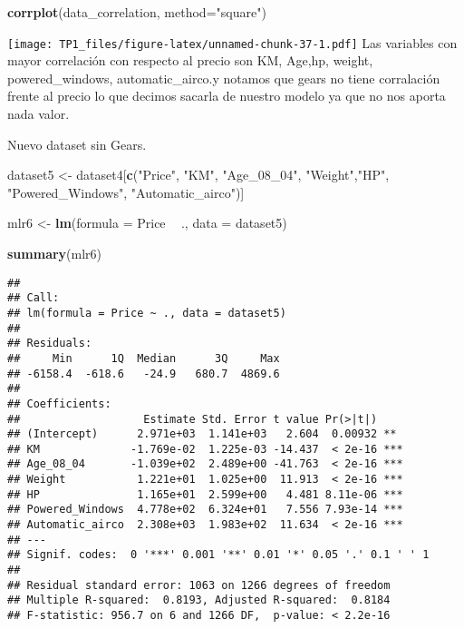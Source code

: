 \documentclass[
]{article}
\newenvironment{Shaded}{\begin{snugshade}}{\end{snugshade}}
\newcommand{\DataTypeTok}[1]{\textcolor[rgb]{0.13,0.29,0.53}{#1}}
\newcommand{\KeywordTok}[1]{\textcolor[rgb]{0.13,0.29,0.53}{\textbf{#1}}}
\newcommand{\NormalTok}[1]{#1}
\newcommand{\OperatorTok}[1]{\textcolor[rgb]{0.81,0.36,0.00}{\textbf{#1}}}
\newcommand{\StringTok}[1]{\textcolor[rgb]{0.31,0.60,0.02}{#1}}
\begin{document}
\begin{Shaded}
\begin{Highlighting}[]
\KeywordTok{corrplot}\NormalTok{(data_correlation, }\DataTypeTok{method=}\StringTok{"square"}\NormalTok{)}
\end{Highlighting}
\end{Shaded}

\texttt{[image: TP1\_files/figure-latex/unnamed-chunk-37-1.pdf]} Las
variables con mayor correlación con respecto al precio son KM, Age,hp,
weight, powered\_windows, automatic\_airco.y notamos que gears no tiene
corralación frente al precio lo que decimos sacarla de nuestro modelo ya
que no nos aporta nada valor.

Nuevo dataset sin Gears.

\begin{Shaded}
\begin{Highlighting}[]
\NormalTok{dataset5 <-}\StringTok{ }\NormalTok{dataset4[}\KeywordTok{c}\NormalTok{(}\StringTok{"Price"}\NormalTok{, }\StringTok{"KM"}\NormalTok{, }\StringTok{"Age_08_04"}\NormalTok{, }\StringTok{"Weight"}\NormalTok{,}\StringTok{"HP"}\NormalTok{, }
                       \StringTok{"Powered_Windows"}\NormalTok{, }\StringTok{"Automatic_airco"}\NormalTok{)]}

\NormalTok{mlr6 <-}\StringTok{ }\KeywordTok{lm}\NormalTok{(}\DataTypeTok{formula =}\NormalTok{ Price }\OperatorTok{~}\StringTok{ }\NormalTok{., }\DataTypeTok{data =}\NormalTok{ dataset5)}

\KeywordTok{summary}\NormalTok{(mlr6)}
\end{Highlighting}
\end{Shaded}

\begin{verbatim}
## 
## Call:
## lm(formula = Price ~ ., data = dataset5)
## 
## Residuals:
##     Min      1Q  Median      3Q     Max 
## -6158.4  -618.6   -24.9   680.7  4869.6 
## 
## Coefficients:
##                   Estimate Std. Error t value Pr(>|t|)    
## (Intercept)      2.971e+03  1.141e+03   2.604  0.00932 ** 
## KM              -1.769e-02  1.225e-03 -14.437  < 2e-16 ***
## Age_08_04       -1.039e+02  2.489e+00 -41.763  < 2e-16 ***
## Weight           1.221e+01  1.025e+00  11.913  < 2e-16 ***
## HP               1.165e+01  2.599e+00   4.481 8.11e-06 ***
## Powered_Windows  4.778e+02  6.324e+01   7.556 7.93e-14 ***
## Automatic_airco  2.308e+03  1.983e+02  11.634  < 2e-16 ***
## ---
## Signif. codes:  0 '***' 0.001 '**' 0.01 '*' 0.05 '.' 0.1 ' ' 1
## 
## Residual standard error: 1063 on 1266 degrees of freedom
## Multiple R-squared:  0.8193, Adjusted R-squared:  0.8184 
## F-statistic: 956.7 on 6 and 1266 DF,  p-value: < 2.2e-16
\end{verbatim}
\end{document}
